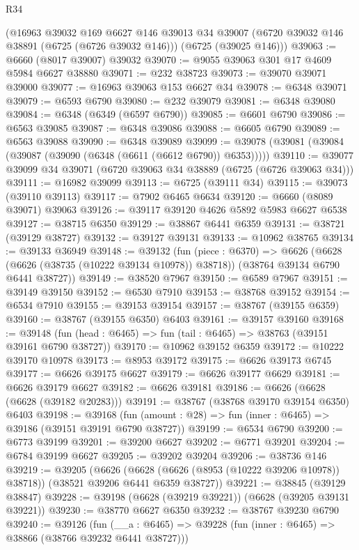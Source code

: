 \begin{lexlean}{R34}
\begin{coremodule}
    (@16963
      @39032
      @169
      @6627
      @146
      @39013
      @34
      @39007
      (@6720 @39032 @146 @38891 (@6725 (@6726 @39032 @146)))
      (@6725 (@39025 @146)))
@39063 := @6660 (@8017 @39007) @39032
@39070 := @9055 @39063 @301 @17 @4609 @5984 @6627 @38880
@39071 := @232 @38723
@39073 := @39070 @39071 @39000
@39077 := @16963 @39063 @153 @6627 @34
@39078 := @6348 @39071
@39079 := @6593 @6790
@39080 := @232 @39079
@39081 := @6348 @39080
@39084 := @6348 (@6349 (@6597 @6790))
@39085 := @6601 @6790
@39086 := @6563 @39085
@39087 := @6348 @39086
@39088 := @6605 @6790
@39089 := @6563 @39088
@39090 := @6348 @39089
@39099 := @39078 (@39081 (@39084 (@39087 (@39090 (@6348 (@6611 (@6612 @6790)) @6353)))))
@39110 := @39077 @39099 @34 @39071 (@6720 @39063 @34 @38889 (@6725 (@6726 @39063 @34)))
@39111 := @16982 @39099
@39113 := @6725 (@39111 @34)
@39115 := @39073 (@39110 @39113)
@39117 := @7902 @6465 @6634
@39120 := @6660 (@8089 @39071) @39063
@39126 := @39117 @39120 @4626 @5892 @5983 @6627 @6538
@39127 := @38715 @6350
@39129 := @38867 @6441 @6359
@39131 := @38721 (@39129 @38727)
@39132 := @39127 @39131
@39133 := @10962 @38765
@39134 := @39133 @36949
@39148 := @39132
    (fun (piece : @6370) =>
    @6626 (@6628 (@6626 (@38735 (@10222 @39134 @10978)) @38718)) (@38764 @39134 @6790 @6441 @38727))
@39149 := @38520 @7967
@39150 := @6589 @7967
@39151 := @39149 @39150
@39152 := @6530 @7910
@39153 := @38768 @39152
@39154 := @6534 @7910
@39155 := @39153 @39154
@39157 := @38767 (@39155 @6359)
@39160 := @38767 (@39155 @6350) @6403
@39161 := @39157 @39160
@39168 := @39148 (fun (head : @6465) => fun (tail : @6465) => @38763 (@39151 @39161 @6790 @38727))
@39170 := @10962 @39152 @6359
@39172 := @10222 @39170 @10978
@39173 := @8953 @39172
@39175 := @6626 @39173 @6745
@39177 := @6626 @39175 @6627
@39179 := @6626 @39177 @6629
@39181 := @6626 @39179 @6627
@39182 := @6626 @39181
@39186 := @6626 (@6628 (@6628 (@39182 @20283)))
@39191 := @38767 (@38768 @39170 @39154 @6350) @6403
@39198 := @39168 (fun (amount : @28) => fun (inner : @6465) => @39186 (@39151 @39191 @6790 @38727))
@39199 := @6534 @6790
@39200 := @6773 @39199
@39201 := @39200 @6627
@39202 := @6771 @39201
@39204 := @6784 @39199 @6627
@39205 := @39202 @39204
@39206 := @38736 @146
@39219 := @39205
    (@6626 (@6628 (@6626 (@8953 (@10222 @39206 @10978)) @38718)) (@38521 @39206 @6441 @6359 @38727))
@39221 := @38845 (@39129 @38847)
@39228 := @39198 (@6628 (@39219 @39221)) (@6628 (@39205 @39131 @39221))
@39230 := @38770 @6627 @6350
@39232 := @38767 @39230 @6790
@39240 := @39126
    (fun (__a : @6465) => @39228 (fun (inner : @6465) => @38866 (@38766 @39232 @6441 @38727)))

\end{coremodule}
\end{lexlean}
